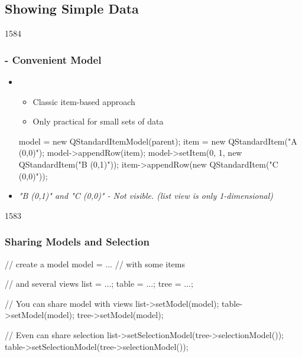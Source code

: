 %
%
%
%

\subsection{Showing Simple Data}


\begin{slide}[fragile]{1584}\frametitle{ -
    Convenient Model}
  \begin{itemize}
  \item {}
    \begin{itemize}
   \item Classic item-based approach
    \item Only practical for small sets of data
 \end{itemize}
   \begin{cpp}
model = new QStandardItemModel(parent);
item = new QStandardItem("A (0,0)");
model->appendRow(item);
model->setItem(0, 1, new QStandardItem("B (0,1)"));
item->appendRow(new QStandardItem("C (0,0)"));
\end{cpp}
\item \textit{"B (0,1)" and "C (0,0)" - Not visible. (list view is only 1-dimensional)}
\end{itemize}
\end{slide}

\begin{slide}[fragile]{1583}\frametitle{Sharing Models and Selection}
  \begin{cpp}
// create a model
model = ... // with some items

// and several views
list = ...; table = ...; tree = ...;

// You can share model with views
list->setModel(model);      
table->setModel(model);      
tree->setModel(model);      

// Even can share selection
list->setSelectionModel(tree->selectionModel());
table->setSelectionModel(tree->selectionModel());
   \end{cpp}
\end{slide}


